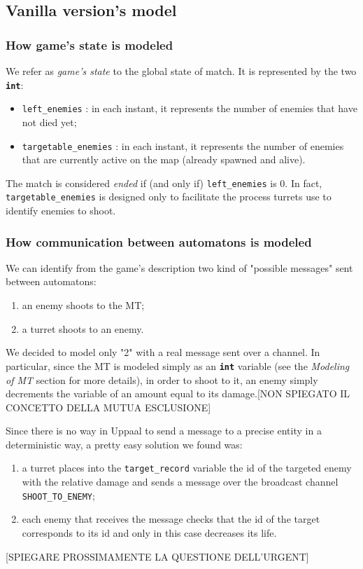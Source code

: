\documentclass[
10pt, %
a4paper, %
oneside, %
headinclude,footinclude, %
BCOR5mm, %
]{scrartcl}
\begin{document}
\subsection{Vanilla version's model}
\subsubsection{How game's state is modeled}
We refer as \emph{game's state} to the global state of match. It is represented by the two \texttt{\textbf{int}}:
\begin{itemize}
	\item \texttt{left\_enemies} : in each instant, it represents the number of enemies that have not died yet;
	\item \texttt{targetable\_enemies} : in each instant, it represents the number of enemies that are currently active on the map (already spawned and alive).
\end{itemize}
The match is considered \emph{ended} if (and only if) \texttt{left\_enemies} is 0. In fact, \texttt{targetable\_enemies} is designed only to facilitate the process turrets use to identify enemies to shoot.

\subsubsection{How communication between automatons is modeled}
We can identify from the game's description two kind of "possible messages" sent between automatons:
\begin{enumerate}
	\item an enemy shoots to the MT;
	\item a turret shoots to an enemy.
\end{enumerate}
We decided to model only "2" with a real message sent over a channel. In particular, since the MT is modeled simply as an \texttt{\textbf{int}} variable (see the \emph{Modeling of MT} section for more details), in order to shoot to it, an enemy simply decrements the variable of an amount equal to its damage.[NON SPIEGATO IL CONCETTO DELLA MUTUA ESCLUSIONE]

Since there is no way in Uppaal to send a message to a precise entity in a deterministic way, a pretty easy solution we found was:
\begin{enumerate}
	\item a turret places into the \texttt{target\_record} variable the id of the targeted enemy with the relative damage and sends a message over the broadcast channel \texttt{SHOOT\_TO\_ENEMY};
	\item each enemy that receives the message checks that the id of the target corresponds to its id and only in this case decreases its life.
\end{enumerate}
[SPIEGARE PROSSIMAMENTE LA QUESTIONE DELL'URGENT]
\end{document}
